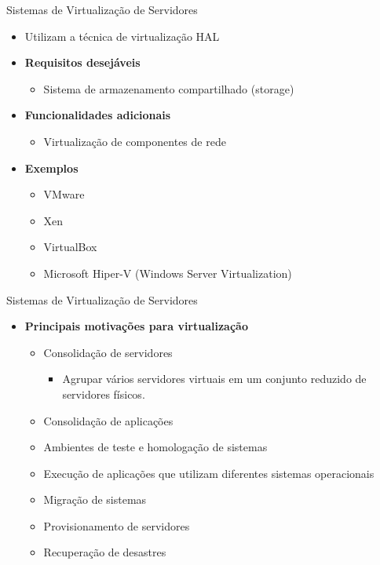 \documentclass{beamer}
\begin{document}
\begin{frame}{Sistemas de Virtualização de Servidores}
    \begin{itemize}
        \item Utilizam a técnica de virtualização HAL
        \item \textbf{Requisitos desejáveis}
        \begin{itemize}
            \item Sistema de armazenamento compartilhado (storage)
        \end{itemize}
        
        \item \textbf{Funcionalidades adicionais}
        \begin{itemize}
            \item Virtualização de componentes de rede
        \end{itemize}
        
        \item \textbf{Exemplos}
        \begin{itemize}
            \item VMware
            \item Xen
            \item VirtualBox
            \item Microsoft Hiper-V (Windows Server Virtualization)
        \end{itemize}
    \end{itemize}
\end{frame}
\begin{frame}{Sistemas de Virtualização de Servidores}
    \begin{itemize}
        \item \textbf{Principais motivações para virtualização}
        \begin{itemize}
            \item Consolidação de servidores
            \begin{itemize}
                \item Agrupar vários servidores virtuais em um conjunto reduzido de servidores físicos.
            \end{itemize}
            \item Consolidação de aplicações
            \item Ambientes de teste e homologação de sistemas
            \item Execução de aplicações que utilizam diferentes sistemas operacionais
            \item Migração de sistemas
            \item Provisionamento de servidores
            \item Recuperação de desastres
        \end{itemize}
    \end{itemize}
\end{frame}
\end{document}
